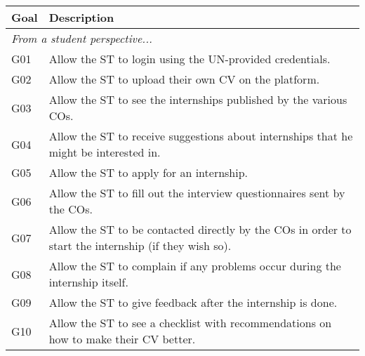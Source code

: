 \begin{longtable}{|l|p{}|}
    \hline
    \textbf{Goal} & \textbf{Description}                                                                                                                              \\
    \hline \hline
    \multicolumn{2}{|l|}{\textit{From a student perspective...}}                                                                                                      \\
    \hline
    G01           & Allow the ST to login using the UN-provided credentials.                                                                                          \\
    \hline
    G02           & Allow the ST to upload their own CV on the platform.                                                                                              \\
    \hline
    G03           & Allow the ST to see the internships published by the various COs.                                                                                 \\
    \hline
    G04           & Allow the ST to receive suggestions about internships that he might be interested in.                                                             \\
    \hline
    G05           & Allow the ST to apply for an internship.                                                                                                          \\
    \hline
    G06           & Allow the ST to fill out the interview questionnaires sent by the COs.                                                                            \\
    \hline
    G07           & Allow the ST to be contacted directly by the COs in order to start the internship (if they wish so).                                              \\
    \hline
    G08           & Allow the ST to complain if any problems occur during the internship itself.                                                                      \\
    \hline
    G09           & Allow the ST to give feedback after the internship is done.                                                                                       \\
    \hline
    G10           & Allow the ST to see a checklist with recommendations on how to make their CV better.                                                              \\

\end{longtable}
